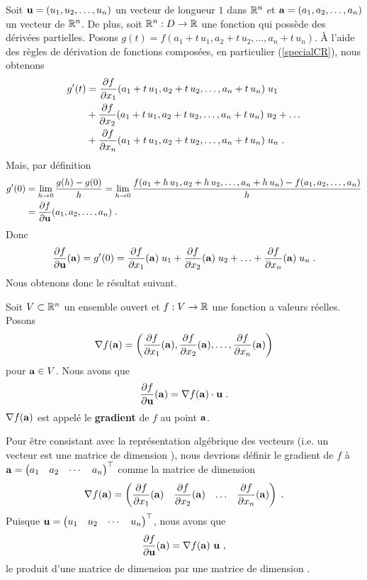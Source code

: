 {Soit $\mathbf{u} = (u_1,u_2, \ldots, u_n)$ un vecteur de longueur $1$ dans
$\mathbb{R}^n$ et $\mathbf{a}=(a_1,a_2,\ldots,a_n)$ un vecteur de $\mathbb{R}^n$. De plus,
soit $\mathbb{R}^n:D\rightarrow \mathbb{R}$ une fonction qui possède des dérivées
partielles.
Posons $g(t) = f(a_1+t\,u_1,a_2+t\,u_2, \ldots, a_n + t\, u_n)$. 
À l'aide des règles de dérivation de fonctions composées, en
particulier (\ref{specialCR}), nous obtenons
\begin{align*}
g'(t) &= \frac{\partial f}{\partial x_1}(a_1+t\,u_1,a_2+t\,u_2, \ldots, a_n + t\,u_n)\;u_1 \\
&+ \frac{\partial f}{\partial x_2}(a_1+t\,u_1,a_2+t\,u_2, \ldots, a_n + t\,u_n)\;u_2 + \ldots \\
&+ \frac{\partial f}{\partial x_n}(a_1+t\,u_1,a_2+t\,u_2, \ldots, a_n + t\,u_n)\;u_n \; .
\end{align*}
Mais, par définition
\begin{align*}
g'(0) &= \lim_{h\rightarrow 0} \frac{g(h)-g(0)}{h}
= \lim_{h\rightarrow 0}
\frac{f(a_1+h\,u_1,a_2+h\,u_2, \ldots, a_n + h\, u_n)
- f(a_1,a_2, \ldots, a_n)}{h} \\
&= \frac{\partial f}{\partial \mathbf{u}}(a_1,a_2, \ldots, a_n) \; .
\end{align*}
Donc
\[
\frac{\partial f}{\partial \mathbf{u}}(\mathbf{a}) = g'(0)
= \frac{\partial f}{\partial x_1}(\mathbf{a})\;u_1 +
\frac{\partial f}{\partial x_2}(\mathbf{a})\;u_2 +
\ldots + \frac{\partial f}{\partial x_n}(\mathbf{a})\;u_n \; .
\]
Nous obtenons donc le résultat suivant.

\begin{prop} 
Soit $V\subset \mathbb{R}^n$ un ensemble ouvert et $f:V\rightarrow \mathbb{R}$ une
fonction a valeurs réelles.  Posons
\begin{equation}\label{gradient}
\nabla f(\mathbf{a}) = \left(\frac{\partial f}{\partial x_1}(\mathbf{a}),
\frac{\partial f}{\partial x_2}(\mathbf{a}), \ldots, \frac{\partial f}{\partial x_n}(\mathbf{a}) \right)
\end{equation}
pour $\mathbf{a} \in V$.  Nous avons que
\begin{equation}\label{dirderGrad}
\frac{\partial f}{\partial \mathbf{u}}(\mathbf{a}) =
\nabla f(\mathbf{a}) \cdot \mathbf{u} \; .
\end{equation}
$\nabla f(\mathbf{a})$ est appelé le {\bfseries gradient} de $f$ au point
$\mathbf{a}$.
\end{prop}

\begin{rmk}
Pour être consistant avec la représentation algébrique des vecteurs (i.e. un
vecteur est une matrice de dimension ), nous devrions définir le
gradient de $f$ à $\displaystyle \mathbf{a} = \begin{pmatrix}
a_1 & a_2 & \cdots & a_n \end{pmatrix}^\top$ comme la matrice de dimension
\[
\nabla f(\mathbf{a}) =
\begin{pmatrix}\displaystyle \frac{\partial f}{\partial x_1}(\mathbf{a}) &
\displaystyle \frac{\partial f}{\partial x_2}(\mathbf{a}) & \ldots &
\displaystyle \frac{\partial f}{\partial x_n}(\mathbf{a}) \end{pmatrix} \; .
\]
Puisque $\displaystyle \mathbf{u} = \begin{pmatrix} u_1 & u_2 & \cdots &
u_n \end{pmatrix}^\top$, nous avons que
\[
\frac{\partial f}{\partial \mathbf{u}}(\mathbf{a}) =
\nabla f(\mathbf{a})\ \mathbf{u} \ ,
\]
le produit d'une matrice de dimension  par une matrice de
dimension .


\end{rmk}}
